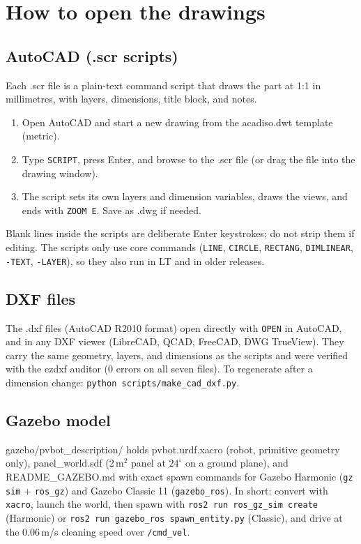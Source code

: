 \documentclass[11pt,a4paper]{article}
\newcommand{\fpath}[1]{{\ttfamily\small #1}}
\begin{document}
\section{How to open the drawings}

\subsection{AutoCAD (.scr scripts)}
Each \fpath{.scr} file is a plain-text command script that draws the part at
1:1 in millimetres, with layers, dimensions, title block, and notes.
\begin{enumerate}
  \item Open AutoCAD and start a new drawing from the \fpath{acadiso.dwt}
        template (metric).
  \item Type \texttt{SCRIPT}, press Enter, and browse to the \fpath{.scr}
        file (or drag the file into the drawing window).
  \item The script sets its own layers and dimension variables, draws the
        views, and ends with \texttt{ZOOM E}. Save as \fpath{.dwg} if needed.
\end{enumerate}
Blank lines inside the scripts are deliberate Enter keystrokes; do not strip
them if editing. The scripts only use core commands (\texttt{LINE},
\texttt{CIRCLE}, \texttt{RECTANG}, \texttt{DIMLINEAR}, \texttt{-TEXT},
\texttt{-LAYER}), so they also run in LT and in older releases.

\subsection{DXF files}
The \fpath{.dxf} files (AutoCAD R2010 format) open directly with
\texttt{OPEN} in AutoCAD, and in any DXF viewer (LibreCAD, QCAD, FreeCAD,
DWG TrueView). They carry the same geometry, layers, and dimensions as the
scripts and were verified with the \fpath{ezdxf} auditor (0 errors on all
seven files). To regenerate after a dimension change:
\texttt{python scripts/make\_cad\_dxf.py}.

\subsection{Gazebo model}
\fpath{gazebo/pvbot\_description/} holds \fpath{pvbot.urdf.xacro} (robot,
primitive geometry only), \fpath{panel\_world.sdf} (2\,m$^2$ panel at
$24^\circ$ on a ground plane), and \fpath{README\_GAZEBO.md} with exact
spawn commands for Gazebo Harmonic (\texttt{gz sim} + \texttt{ros\_gz}) and
Gazebo Classic 11 (\texttt{gazebo\_ros}). In short: convert with
\texttt{xacro}, launch the world, then spawn with
\texttt{ros2 run ros\_gz\_sim create} (Harmonic) or
\texttt{ros2 run gazebo\_ros spawn\_entity.py} (Classic), and drive at the
0.06\,m/s cleaning speed over \texttt{/cmd\_vel}.
\end{document}
